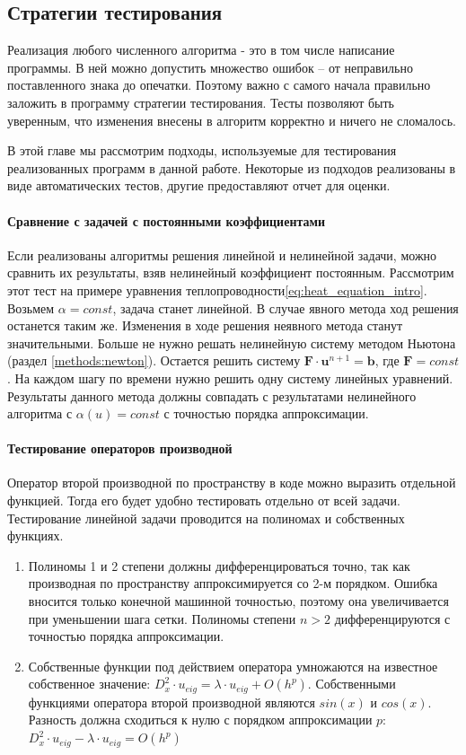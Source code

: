 \subsection{Стратегии тестирования \label{implementation:testing}}
Реализация любого численного алгоритма - это в том числе написание программы. В ней можно допустить множество ошибок – от неправильно поставленного знака до опечатки. Поэтому важно с самого начала правильно заложить в программу стратегии тестирования. Тесты позволяют быть уверенным, что изменения внесены в алгоритм корректно и ничего не сломалось.
\par
В этой главе мы рассмотрим подходы, используемые для тестирования реализованных программ в данной работе. Некоторые из подходов реализованы в виде автоматических тестов, другие предоставляют отчет для оценки.

\paragraph{Сравнение с задачей с постоянными коэффициентами}
Если реализованы алгоритмы решения линейной и нелинейной задачи, можно сравнить их результаты, взяв нелинейный коэффициент постоянным. Рассмотрим этот тест на примере уравнения теплопроводности\eqref{eq:heat_equation_intro}. Возьмем $\alpha = const$, задача станет линейной. В случае явного метода ход решения останется таким же. Изменения в ходе решения неявного метода станут значительными. Больше не нужно решать нелинейную систему методом Ньютона (раздел \ref{methods:newton}). Остается решить систему $\mathbf{F} \cdot \mathbf{u}^{n+1} = \mathbf{b}$, где $\mathbf{F} = const$. На каждом шагу по времени нужно решить одну систему линейных уравнений. Результаты данного метода должны совпадать с результатами нелинейного алгоритма с $\alpha(u) = const$ с точностью порядка аппроксимации.

\paragraph{Тестирование операторов производной}
Оператор второй производной по пространству в коде можно выразить отдельной функцией. Тогда его будет удобно тестировать отдельно от всей задачи.
Тестирование линейной задачи проводится на полиномах и собственных функциях. 
\begin{enumerate}
\item Полиномы 1 и 2 степени должны дифференцироваться точно, так как производная по пространству аппроксимируется со 2-м порядком. Ошибка вносится только конечной машинной точностью, поэтому она увеличивается при уменьшении шага сетки. Полиномы степени $n > 2$ дифференцируются с точностью порядка аппроксимации.
\item Собственные функции под действием оператора умножаются на известное собственное значение: $D^2_x \cdot u_{eig} = \lambda \cdot u_{eig} + O(h^p)$. Собственными функциями оператора второй производной являются $sin (x)$ и $cos(x)$. 
Разность должна сходиться к нулю с порядком аппроксимации $p$: $D^2_x \cdot u_{eig} - \lambda \cdot u_{eig} = O(h^p)$
\end{enumerate}

